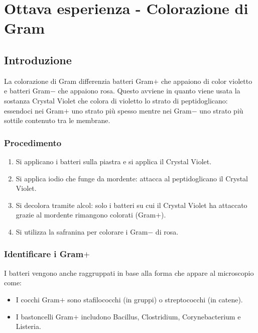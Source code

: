 \section{Ottava esperienza - Colorazione di Gram}
	\subsection{Introduzione}
	La colorazione di Gram differenzia batteri Gram$+$ che appaiono di color violetto e batteri Gram$-$ che appaiono rosa.
	Questo avviene in quanto viene usata la sostanza Crystal Violet che colora di violetto lo strato di peptidoglicano: essendoci nei Gram$+$ uno strato pi\`u spesso mentre nei Gram$-$ uno strato pi\`u sottile contenuto tra le membrane.

		\subsubsection{Procedimento}
		\begin{enumerate}
			\item Si applicano i batteri sulla piastra e si applica il Crystal Violet.
			\item Si applica iodio che funge da mordente: attacca al peptidoglicano il Crystal Violet.
			\item Si decolora tramite alcol: solo i batteri su cui il Crystal Violet ha attaccato grazie al mordente rimangono colorati (Gram$+$).
			\item Si utilizza la safranina per colorare i Gram$-$ di rosa.
		\end{enumerate}

		\subsubsection{Identificare i Gram$\mathbf{+}$}
		I batteri vengono anche raggruppati in base alla forma che appare al microscopio come:
		\begin{multicols}{2}
			\begin{itemize}
				\item I cocchi Gram$+$ sono stafilococchi (in gruppi) o streptococchi (in catene).
				\item I bastoncelli Gram$+$ includono Bacillus, Clostridium, Corynebacterium e Listeria.
			\end{itemize}
		\end{multicols}


